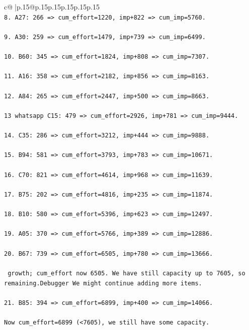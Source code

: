 \documentclass{article}
\begin{document}
{\begin{supertabular}{c@{$\;$}|p{.15\linewidth}@{}p{.15\linewidth}p{.15\linewidth}p{.15\linewidth}p{.15\linewidth}p{.15\linewidth}}
{{{\\ 
\texttt{8. A27: 266 => cum\_effort=1220, imp+822 => cum\_imp=5760.} \\
\\ 
\texttt{9. A30: 259 => cum\_effort=1479, imp+739 => cum\_imp=6499.} \\
\\ 
\texttt{10. B60: 345 => cum\_effort=1824, imp+808 => cum\_imp=7307.} \\
\\ 
\texttt{11. A16: 358 => cum\_effort=2182, imp+856 => cum\_imp=8163.} \\
\\ 
\texttt{12. A84: 265 => cum\_effort=2447, imp+500 => cum\_imp=8663.} \\
\\ 
\texttt{13 whatsapp C15: 479 => cum\_effort=2926, imp+781 => cum\_imp=9444.} \\
\\ 
\texttt{14. C35: 286 => cum\_effort=3212, imp+444 => cum\_imp=9888.} \\
\\ 
\texttt{15. B94: 581 => cum\_effort=3793, imp+783 => cum\_imp=10671.} \\
\\ 
\texttt{16. C70: 821 => cum\_effort=4614, imp+968 => cum\_imp=11639.} \\
\\ 
\texttt{17. B75: 202 => cum\_effort=4816, imp+235 => cum\_imp=11874.} \\
\\ 
\texttt{18. B10: 580 => cum\_effort=5396, imp+623 => cum\_imp=12497.} \\
\\ 
\texttt{19. A05: 370 => cum\_effort=5766, imp+389 => cum\_imp=12886.} \\
\\ 
\texttt{20. B67: 739 => cum\_effort=6505, imp+780 => cum\_imp=13666.} \\
\\ 
\texttt{ growth; cum\_effort now 6505. We have still capacity up to 7605, so remaining.Debugger We might continue adding more items.} \\
\\ 
\texttt{21. B85: 394 => cum\_effort=6899, imp+400 => cum\_imp=14066.} \\
\\ 
\texttt{Now cum\_effort=6899 (<7605), we still have some capacity.} \\
\\ 
}}}
\end{supertabular}}
\end{document}
